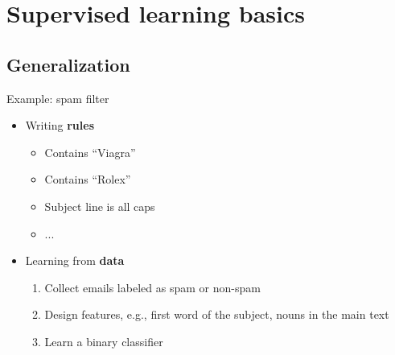 \documentclass[usenames,dvipsnames,notes,11pt,aspectratio=169]{beamer}
\begin{document}
\section{Supervised learning basics}

\subsection{Generalization}
%

\begin{frame}
    {Example: spam filter}
    
    \begin{itemize}
        \itemsep1em
        \item Writing {\bf rules}
            \begin{itemize}
                \item[] Contains ``Viagra''
                \item[] Contains ``Rolex''
                \item[] Subject line is all caps
                \item[] ... 
            \end{itemize}
        \item Learning from {\bf data}
            \begin{enumerate}
                \item Collect emails labeled as spam or non-spam 
                \item Design features, e.g., first word of the subject, nouns in the main text
                \item Learn a binary classifier 
            \end{enumerate}
    \end{itemize}
    \medskip\pause
\end{frame}
\end{document}
